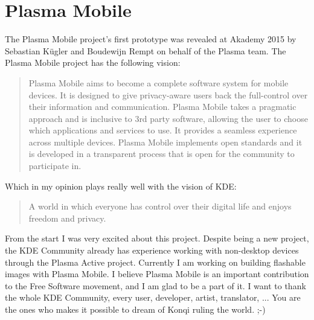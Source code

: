 \section*{Plasma Mobile} The Plasma Mobile project's first prototype was revealed at Akademy 2015 by Sebastian K\"{u}gler and Boudewijn Rempt on behalf of the Plasma team. The Plasma Mobile project has the following vision:

\begin{quote}
Plasma Mobile aims to become a complete software system for mobile devices. It is designed to give privacy-aware users back the full-control over their information and communication. Plasma Mobile takes a pragmatic approach and is inclusive to 3rd party software, allowing the user to choose which applications and services to use. It provides a seamless experience across multiple devices. Plasma Mobile implements open standards and it is developed in a transparent process that is open for the community to participate in.
\end{quote}

\noindent{}Which in my opinion plays really well with the vision of KDE:

\begin{quote}
A world in which everyone has control over their digital life and enjoys freedom and privacy.
\end{quote}

\noindent{}From the start I was very excited about this project. Despite being a new project, the KDE Community already has experience working with non-desktop devices through the Plasma Active project. Currently I am working on building flashable images with Plasma Mobile. I believe Plasma Mobile is an important contribution to the Free Software movement, and I am glad to be a part of it.
\linebreak 
\linebreak
I want to thank the whole KDE Community, every user, developer, artist, translator, ... You are the ones who makes it possible to dream of Konqi ruling the world. ;-)
